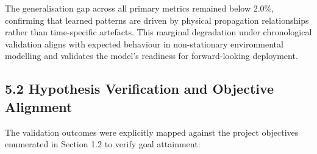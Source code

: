 The generalisation gap across all primary metrics remained below 2.0\%,
confirming that learned patterns are driven by physical propagation
relationships rather than time-specific artefacts. This marginal
degradation under chronological validation aligns with expected
behaviour in non-stationary environmental modelling and validates the
model's readiness for forward-looking deployment.

\subsection{5.2 Hypothesis Verification and Objective
Alignment}\label{hypothesis-verification-and-objective-alignment}

The validation outcomes were explicitly mapped against the project
objectives enumerated in Section 1.2 to verify goal attainment:

